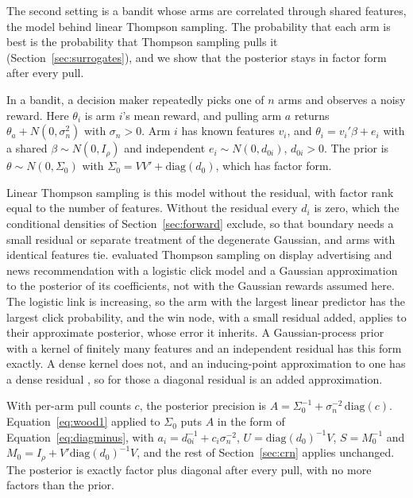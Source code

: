 \documentclass[11pt]{article}
\begin{document}
The second setting is a bandit whose arms are correlated through
shared features, the model behind linear Thompson sampling. The
probability that each arm is best is the probability that Thompson
sampling pulls it (Section~\ref{sec:surrogates}), and we show that
the posterior stays in factor form after every pull.

In a bandit, a decision maker repeatedly picks one of $n$ arms and
observes a noisy reward. Here $\theta_i$ is arm $i$'s mean reward,
and pulling arm $a$ returns $\theta_a + N(0, \sigma_n^2)$ with
$\sigma_n > 0$. Arm $i$ has known features $v_i$, and $\theta_i =
v_i' \beta + e_i$ with a shared $\beta \sim N(0, I_\rho)$ and
independent $e_i \sim N(0, d_{0i})$, $d_{0i} > 0$. The prior is
$\theta \sim N(0, \Sigma_0)$ with $\Sigma_0 = V V' +
\mathrm{diag}(d_0)$, which has factor form.

Linear Thompson sampling \citep{agrawal2013} is this model without
the residual, with factor rank equal to the number of features.
Without the residual every $d_i$ is zero, which the conditional
densities of Section~\ref{sec:forward} exclude, so that boundary
needs a small residual or separate treatment of the degenerate
Gaussian, and arms with identical features tie. \citet{chapelle2011}
evaluated Thompson sampling on display advertising and news
recommendation with a logistic click model and a Gaussian
approximation to the posterior of its coefficients, not with the
Gaussian rewards assumed here. The logistic link is increasing, so
the arm with the largest linear predictor has the largest click
probability, and the win node, with a small residual added, applies
to their approximate posterior, whose error it inherits. A
Gaussian-process prior with a kernel of finitely many features and an
independent residual has this form exactly. A dense kernel does not,
and an inducing-point approximation to one has a dense residual
\citep{titsias2009}, so for those a diagonal residual is an added
approximation.

With per-arm pull counts $c$, the posterior precision is
$A = \Sigma_0^{-1} + \sigma_n^{-2}\,\mathrm{diag}(c)$.
Equation~\eqref{eq:wood1} applied to $\Sigma_0$ puts $A$ in the form
of Equation~\eqref{eq:diagminus}, with $a_i = d_{0i}^{-1} + c_i
\sigma_n^{-2}$, $U=\mathrm{diag}(d_0)^{-1}V$, $S = M_0^{-1}$ and $M_0 = I_\rho + V'
\mathrm{diag}(d_0)^{-1} V$, and the rest of Section~\ref{sec:crn}
applies unchanged. The posterior is exactly factor plus diagonal
after every pull, with no more factors than the prior.
\end{document}
